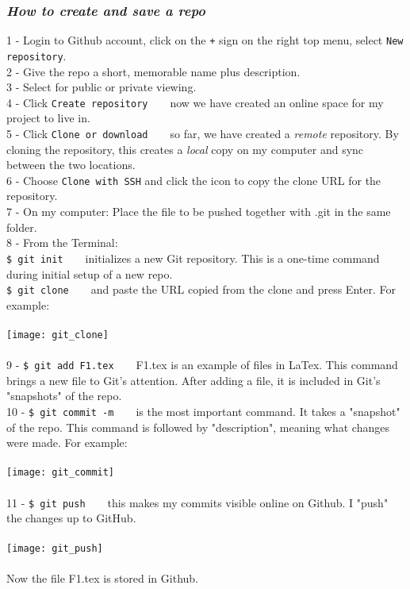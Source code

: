 \documentclass{article}
\begin{document}
{{{\subsubsection{\small\textsl{How to create and save a repo}}

1 - Login to Github account, click on the \texttt{+} sign on the right top menu, select \texttt{New repository}.\\
2 - Give the repo a short, memorable name plus description. \\
3 - Select for public or private viewing.\\ 
4 - Click \texttt{Create repository} ~ ~ now we have created an online space for my project to live in. \\
5 - Click \texttt{Clone or download} ~ ~ so far, we have created a \textit{remote} repository. By cloning the repository, this creates a \textit{local} copy on my computer and sync between the two locations.\\
6 - Choose \texttt{Clone with SSH} and click the icon to copy the clone URL for the repository.\\
7 - On my computer: Place the file to be pushed together with .git in the same folder.\\
8 - From the Terminal:\\
\texttt{\$ git init} ~ ~ initializes a new Git repository. This is a one-time command during initial setup of a new repo.\\
\texttt{\$ git clone} ~ ~ and paste the URL copied from the clone and press Enter. For example: \\
\\
\texttt{[image: git\_clone]}\\
\\
9 - \texttt{\$ git add F1.tex} ~ ~ F1.tex is an example of files in LaTex. This command brings a new file to Git's attention. After adding a file, it is included in Git's "snapshots" of the repo.\\
10 - \texttt{\$ git commit -m} ~ ~ is the most important command. It takes a "snapshot" of the repo. This command is followed by "description", meaning what changes were made. For example: \\
\\
\texttt{[image: git\_commit]}\\
\\
11 - \texttt{\$ git push} ~ ~ this makes my commits visible online on Github. I "push" the changes up to GitHub. \\
\\
\texttt{[image: git\_push]}\\
\\
Now the file F1.tex is stored in Github.

}}}
\end{document}
